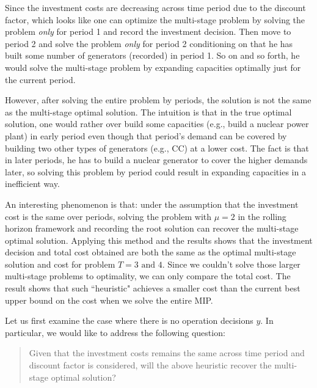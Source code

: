 \documentclass[10pt]{article}
\theoremstyle{plain}
\theoremstyle{definition}
\theoremstyle{remark}
\begin{document}
Since the investment costs are decreasing across time period due to the discount factor,
which looks like one can optimize the multi-stage problem by solving the problem \emph{only} for period 1
and record the investment decision. Then move to period 2 and solve the problem \emph{only} for period 2
conditioning on that he has built some number of generators (recorded) in period 1.
So on and so forth, he would solve the multi-stage problem by expanding capacities optimally just for the current period.

However, after solving the entire problem by periods, the solution is not the same as the multi-stage optimal solution.
The intuition is that in the true optimal solution, one would rather over build some capacities (e.g., build a nuclear power plant)
in early period even though that period's demand can be covered by building two other types of generators (e.g., CC) at a lower cost.
The fact is that in later periods, he has to build a nuclear generator to cover the higher demands later,
so solving this problem by period could result in expanding capacities in a inefficient way.

An interesting phenomenon is that:
{\color{rred}under the assumption that the investment cost is the same over periods,
solving the problem with $\mu=2$ in the rolling horizon framework
and recording the root solution can recover the multi-stage optimal solution.}
Applying this method and the results shows that the investment decision and total cost obtained are both
the same as the optimal multi-stage solution and cost for problem $T=3 \text { and } 4$.
Since we couldn't solve those larger multi-stage problems to optimality, we can only compare the total cost.
The result shows that such ``heuristic" achieves a smaller cost than the current best upper bound on the cost
when we solve the entire MIP.

Let us first examine the case where there is no operation decisions $y$.
In particular, we would like to address the following question:
\begin{quote}
Given that the investment costs remains the same across time period and discount factor
is considered, will the above heuristic recover the multi-stage optimal solution?
\end{quote}
\end{document}
